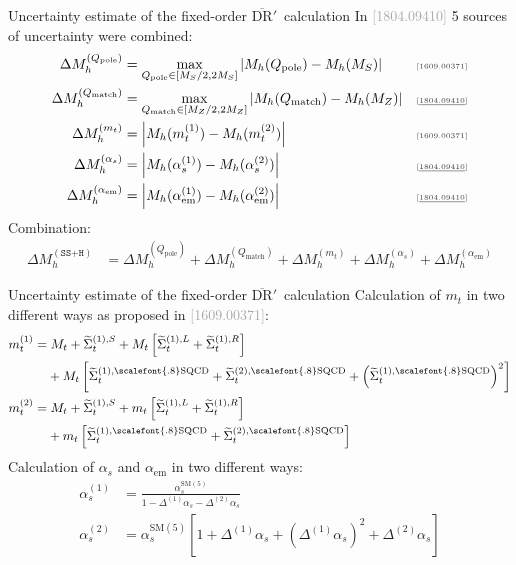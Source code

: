 \documentclass[hyperref={pdfpagelabels=false},ngerman]{beamer}
\newcommand{\MS}{\ensuremath{M_S}}
\newcommand{\mycite}[1]{\ensuremath{\text{\textcolor{darkgray}{\tiny [#1]}}}}
\newcommand{\bigcite}[1]{\textcolor{darkgray}{[#1]}}
\newcommand{\DRbarp}{\ensuremath{\overline{\text{DR}}'}}
\newcommand{\SM}{\ensuremath{\text{SM}}}
\newcommand{\as}{\alpha_s}
\newcommand{\aem}{\alpha_\text{em}}
\newcommand{\SQCD}{\ensuremath{\scalefont{.8}\text{SQCD}}}
\newcommand{\Qpole}{\ensuremath{Q_\text{pole}}}
\newcommand{\Qmatch}{\ensuremath{Q_\text{match}}}
\newcommand{\DMh}{\ensuremath{\Delta M_h^{(\texttt{SS+H})}}}
\newcommand{\DMhQpole}{\ensuremath{\Delta M_h^{(\Qpole)}}}
\newcommand{\DMhQmatch}{\ensuremath{\Delta M_h^{(\Qmatch)}}}
\newcommand{\DMhMt}{\ensuremath{\Delta M_h^{(m_t)}}}
\newcommand{\DMhAlphaS}{\ensuremath{\Delta M_h^{(\as)}}}
\newcommand{\DMhAlphaEm}{\ensuremath{\Delta M_h^{(\aem)}}}
\begin{document}
\begin{frame}{Uncertainty estimate of the fixed-order \DRbarp\ calculation}
  In \bigcite{1804.09410} 5 sources of uncertainty were combined:
  \begin{align*}
    \DMhQpole &= \max_{\Qpole\in[\MS/2,2\MS]}\left|M_h(\Qpole) - M_h(\MS)\right| & \text{\mycite{1609.00371}} \\
    \DMhQmatch &= \max_{\Qmatch\in[M_Z/2,2M_Z]}\left|M_h(\Qmatch) - M_h(M_Z)\right| & \text{\mycite{\underline{1804.09410}}} \\
    \DMhMt &= \left|M_h(m_t^{(1)}) - M_h(m_t^{(2)})\right| & \text{\mycite{1609.00371}} \\
    \DMhAlphaS &= \left| M_h(\as^{(1)}) - M_h(\as^{(2)}) \right| & \text{\mycite{\underline{1804.09410}}} \\
    \DMhAlphaEm &= \left| M_h(\aem^{(1)}) - M_h(\aem^{(2)}) \right| & \text{\mycite{\underline{1804.09410}}}
  \end{align*}
  Combination:
  \begin{align*}
    \DMh &= \DMhQpole + \DMhQmatch + \DMhMt + \DMhAlphaS + \DMhAlphaEm 
  \end{align*}
\end{frame}

\begin{frame}{Uncertainty estimate of the fixed-order \DRbarp\ calculation}
  Calculation of $m_t$ in two different ways as proposed in
  \bigcite{1609.00371}:
  \begin{align*}
    m_t^{(1)} &=
                M_t + \widetilde{\Sigma}_t^{(1),S} +
                M_t \left[
                \widetilde{\Sigma}_t^{(1),L} +
                \widetilde{\Sigma}_t^{(1),R}
                \right] \\
              &\phantom{={}} + M_t
                \left[\widetilde{\Sigma}_t^{(1),\SQCD}
                + \widetilde{\Sigma}_t^{(2),\SQCD}
                + \left(\widetilde{\Sigma}_t^{(1),\SQCD}\right)^2
                \right]\\
    m_t^{(2)} &=
                M_t + \widetilde{\Sigma}_t^{(1),S} +
                m_t \left[
                \widetilde{\Sigma}_t^{(1),L} +
                \widetilde{\Sigma}_t^{(1),R}
                \right] \nonumber \\
              &\phantom{={}} +
                m_t
                \left[\widetilde{\Sigma}_t^{(1),\SQCD} +
                \widetilde{\Sigma}_t^{(2),\SQCD}
                \right]
  \end{align*}
  Calculation of $\as$ and $\aem$ in two different ways:
  \begin{align*}
    \as^{(1)}  &= \frac{\as^{\SM(5)}}{1 - \Delta^{(1)}\as - \Delta^{(2)}\as}\\
    \as^{(2)}  &= \as^{\SM(5)} \left[1 + \Delta^{(1)}\as + (\Delta^{(1)}\as)^2 + \Delta^{(2)}\as\right]
  \end{align*}
\end{frame}
\end{document}
